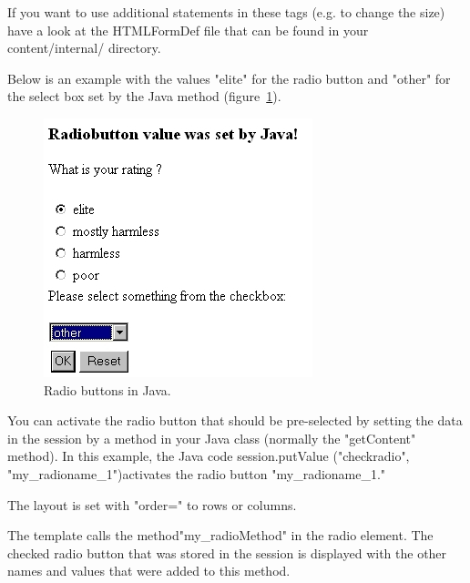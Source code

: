 If you want to use additional statements in these tags (e.g. to change
the size) have a look at the HTMLFormDef file that can be found in your
{\dir content/internal/} directory.

Below is an example with the values "elite" for the radio button and
"other" for the select box set by the Java method (figure~\ref{RadioButtons}).

\begin{figure}
\begin{center}
\includegraphics[clip,width=0.4\linewidth]{pics/modules/47}
\end{center}
\caption[Radio buttons in Java]{Radio buttons in Java.}
\label{RadioButtons}
\end{figure}

You can activate the radio button that should be pre-selected by setting
the data  in the session by a method in your Java class (normally the
{\meth "getContent"} method). In this example, the Java code session.putValue
{\meth("checkradio", "my\_radioname\_1")}activates the radio button
{\meth "my\_radioname\_1."}

The layout is set with {\name "order="} to rows or columns.

The template calls the method{\meth "my\_radioMethod"} in the radio element.
The checked radio button that was stored in the session is displayed
with the other names and values that were added to this method.

